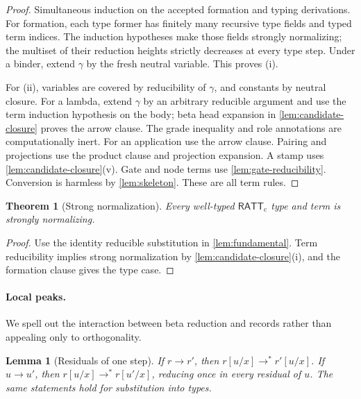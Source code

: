 \documentclass[11pt]{article}
\numberwithin{equation}{section}
\theoremstyle{definition}
\theoremstyle{plain}
\newtheorem{theorem}[definition]{Theorem}
\newtheorem{lemma}[definition]{Lemma}
\theoremstyle{remark}
\newcommand{\RATT}{\mathsf{RATT}_{\mathrm c}}
\begin{document}
\begin{proof}
Simultaneous induction on the accepted formation and typing derivations.
For formation, each type former has finitely many recursive type fields and
typed term indices.  The induction hypotheses make those fields strongly
normalizing; the multiset of their reduction heights strictly decreases at
every type step.  Under a binder, extend \(\gamma\) by the fresh neutral
variable.  This proves (i).

For (ii), variables are covered by reducibility of \(\gamma\), and constants
by neutral closure.  For a lambda, extend \(\gamma\) by an arbitrary
reducible argument and use the term induction hypothesis on the body; beta
head expansion in \cref{lem:candidate-closure} proves the arrow clause.
The grade inequality and role annotations are computationally inert.  For an
application use the arrow clause.  Pairing and projections use the product
clause and projection expansion.  A stamp uses
\cref{lem:candidate-closure}(v).  Gate and node terms use
\cref{lem:gate-reducibility}.  Conversion is harmless by
\cref{lem:skeleton}.  These are all term rules.
\end{proof}

\begin{theorem}[Strong normalization]\label{thm:sn}
Every well-typed \(\RATT\) type and term is strongly normalizing.
\end{theorem}

\begin{proof}
Use the identity reducible substitution in \cref{lem:fundamental}.
Term reducibility implies strong normalization by
\cref{lem:candidate-closure}(i), and the formation clause gives the type
case.
\end{proof}

\paragraph{Local peaks.}
We spell out the interaction between beta reduction and records rather than
appealing only to orthogonality.

\begin{lemma}[Residuals of one step]\label{lem:one-step-substitution}
If \(r\longrightarrow r'\), then
\(r[u/x]\longrightarrow^*r'[u/x]\).  If \(u\longrightarrow u'\), then
\(r[u/x]\longrightarrow^*r[u'/x]\), reducing once in every residual of
\(u\).  The same statements hold for substitution into types.
\end{lemma}
\end{document}
